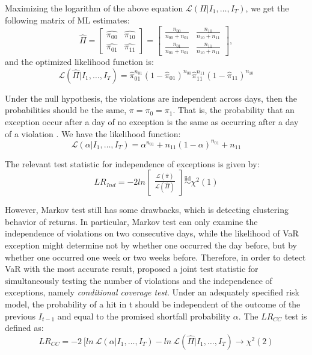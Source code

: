 \documentclass[12pt,a4paper]{article}
\begin{document}
Maximizing the logarithm of the above equation $\mathcal{L}(\Pi\vert I_1, \ldots, I_T)$, we get the following matrix of ML estimates:
\begin{equation}
	\hat{\Pi} = \begin{bmatrix} \hat{\pi_{00}} & \hat{\pi_{10}} \\ \hat{\pi_{01}} & \hat{\pi_{11}} \end{bmatrix} = \begin{bmatrix} \frac{n_{00}}{n_{00} + n_{01}} & \frac{n_{10}}{n_{10} + n_{11}} \\ \frac{n_{01}}{n_{01} + n_{01}} & \frac{n_{11}}{n_{10} + n_{11}} \end{bmatrix},
\end{equation}
and the optimized likelihood function is:
\begin{equation}
	\mathcal{L}(\hat{\Pi}\vert I_1, \ldots, I_T) = \hat{\pi}^{n_{01}}_{01} (1-\hat{\pi}_{01})^{n_{00}} \hat{\pi}^{n_{11}}_{11} (1-\hat{\pi}_{11})^{n_{10}}
\end{equation}

Under the null hypothesis, the violations are independent across days, then the probabilities should be the same, $\pi = \pi_0 = \pi_1$. That is, the probability that an exception occur after a day of no exception is the same as occurring after a day of a violation \cite{campbell2005review}. We have the likelihood function:
\begin{equation}
	\mathcal{L}(\alpha \vert I_1, \ldots, I_T) = \alpha^{n_{01}} + {n_{11}} (1-\alpha) ^{n_{01}} + {n_{11}}
\end{equation}

The relevant test statistic for independence of exceptions is given by:
\begin{equation} 
	LR_{Ind} = -2ln\begin{bmatrix} \frac{\mathcal{L}(\hat{\pi})} {\mathcal{L}(\hat{\Pi})} \end{bmatrix} \overset{\mathrm{iid}}{\sim} \chi^2(1)
\end{equation}

However, Markov test still has some drawbacks, which is detecting clustering behavior of returns. In particular, Markov test can only examine the independence of violations on two consecutive days, while the likelihood of VaR exception might determine not by whether one occurred the day before, but by whether one occurred one week or two weeks before. Therefore, in order to detect VaR with the most accurate result, \cite{christoffersen1998evaluating} proposed a joint test statistic for simultaneously testing the number of violations and the independence of exceptions, namely \textit{conditional coverage test}. Under an adequately specified risk model, the probability of a hit in t should be independent of the outcome of the previous $I_{t-1}$ and equal to the promised shortfall probability $\alpha$. The $LR_{CC}$ test is defined as:
\begin{equation}
	LR_{CC} = -2\:[ln\:\mathcal{L} (\alpha \vert I_1, \ldots, I_T) - ln\: \mathcal{L} (\hat{\Pi} \vert I_1, \ldots, I_T) \rightarrow \chi^2(2)
\end{equation}
\end{document}
